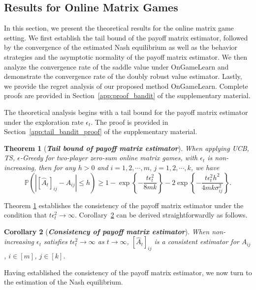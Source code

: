 \documentclass[12pt]{article}
\newtheorem{theorem}{Theorem}
\newtheorem{corollary}[theorem]{Corollary}
\begin{document}
\subsection{Results for Online Matrix Games}
\label{sec:theory_bandit}
In this section, we present the theoretical results for the online matrix game setting. We first establish the tail bound of the payoff matrix estimator, followed by the convergence of the estimated Nash equilibrium as well as the behavior strategies and the asymptotic normality of the payoff matrix estimator. We then analyze the convergence rate of the saddle value under OnGameLearn and demonstrate the convergence rate of the doubly robust value estimator. Lastly, we provide the regret analysis of our proposed method OnGameLearn. Complete proofs are provided in Section~\ref{app:proof_bandit} of the supplementary material.

The theoretical analysis begins with a tail bound for the payoff matrix estimator under the exploration rate $\epsilon_t$. The proof is provided in Section~\ref{app:tail_bandit_proof} of the supplementary material.


\begin{theorem}[{\textbf{\emph{Tail bound of payoff matrix estimator}}}]
\label{thm:tail_bandit}
When applying UCB, TS, $\epsilon$-Greedy for two-player zero-sum online matrix games, with $\epsilon_t$ is non-increasing, then for any $h > 0$ and $i=1,2,\cdots,m,\, j =1,2,\cdots,k$, we have
\begin{equation*}
\mathbb P\left(
\left|
[\widehat A_t]_{ij}-A_{ij}
\right|
\le h
\right)
\ge
1
-
\exp\left\{
-\frac{t \epsilon_t^2}{8mk}
\right\}
-
2\exp\left\{
-\frac{t \epsilon_t^2 h^2}{4mk\sigma_{ij}^2}
\right\}.
\end{equation*}
\end{theorem}
Theorem \ref{thm:tail_bandit} establishes the consistency of the payoff matrix estimator under the condition that $t\epsilon_t^2 \to \infty$. 
Corollary~\ref{coro:consistent_bandit} can be derived straightforwardly as follows.


\begin{corollary}[\textbf{\emph{Consistency of payoff matrix estimator}}]
\label{coro:consistent_bandit}
When non-increasing $\epsilon_t$ satisfies $t\epsilon_t^2 \to \infty$ as $t \to \infty$, $[\widehat{A}_t]_{ij}$ is a consistent estimator for $A_{ij}$, $i \in [m]$, $j \in [k]$.
\end{corollary}


Having established the consistency of the payoff matrix estimator, we now turn to the estimation of the Nash equilibrium. 
\end{document}
